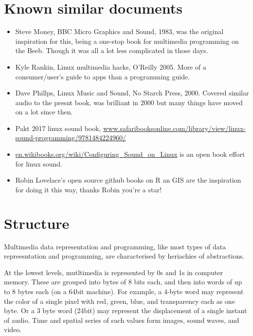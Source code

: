 \documentclass[oneside,english]{scrbook}
\begin{document}
\section{Known similar documents}
\begin{itemize}
	\item Steve Money, BBC Micro Graphics and Sound, 1983, was the original inspiration for this, being a one-stop book for multimedia programming on the Beeb.  Though it was all a lot less complicated in those days.

	\item Kyle Rankin, Linux multimedia hacks, O'Reilly 2005. More of a consumer/user's guide to apps than a programming guide.
	
	\item Dave Phillps, Linux Music and Sound, No Starch Press, 2000. Covered similar audio to the presnt book, was brilliant in 2000 but many things have moved on a lot since then.

	\item Pakt 2017 linux sound book, \url{www.safaribooksonline.com/library/view/linux-sound-programming/9781484224960/}

	\item \url{en.wikibooks.org/wiki/Configuring_Sound_on_Linux} is an open book effort for linux sound.

	\item Robin Lovelace's open source github books on R an GIS are the inspiration for doing it this way, thanks Robin you're a star!

\end{itemize}

		\section{Structure}
Multimedia data representation and programming, like most types of data repreesntation and programming, are characterised by heriachies of abstractions. 

At the lowest levels, mutltimedia is represented by 0s and 1s in computer memory.  These are grouped into bytes of 8 bits each, and then into words of up to 8 bytes each (on a 64bit machine).  For example, a 4-byte word may represent the color of a single pixel with red, green, blue, and transparency each as one byte.  Or a 3 byte word (24bit) may represent the displacement of a single instant of audio.  Time and spatial series of such values form images, sound waves, and video.
\end{document}
